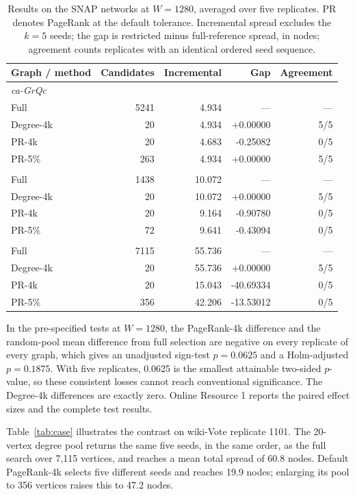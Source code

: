 \documentclass[smallextended]{svjour3}
\begin{document}
\begin{table}[htbp]
\caption{Results on the SNAP networks at $W=1280$, averaged over five replicates. PR denotes PageRank at the default tolerance. Incremental spread excludes the $k=5$ seeds; the gap is restricted minus full-reference spread, in nodes; agreement counts replicates with an identical ordered seed sequence.}\label{tab:primary}
\centering\begin{tabular}{lrrrr}\toprule
Graph / method & Candidates & Incremental & Gap & Agreement \\ \midrule
\multicolumn{5}{l}{\textit{ca-GrQc}} \\
Full & 5241 & 4.934 & --- & --- \\
Degree-4k & 20 & 4.934 & +0.00000 & 5/5 \\
PR-4k & 20 & 4.683 & -0.25082 & 0/5 \\
PR-5\% & 263 & 4.934 & +0.00000 & 5/5 \\
\addlinespace
\multicolumn{5}{l}{\textit{CollegeMsg}} \\
Full & 1438 & 10.072 & --- & --- \\
Degree-4k & 20 & 10.072 & +0.00000 & 5/5 \\
PR-4k & 20 & 9.164 & -0.90780 & 0/5 \\
PR-5\% & 72 & 9.641 & -0.43094 & 0/5 \\
\addlinespace
\multicolumn{5}{l}{\textit{wiki-Vote}} \\
Full & 7115 & 55.736 & --- & --- \\
Degree-4k & 20 & 55.736 & +0.00000 & 5/5 \\
PR-4k & 20 & 15.043 & -40.69334 & 0/5 \\
PR-5\% & 356 & 42.206 & -13.53012 & 0/5 \\
\bottomrule\end{tabular}
\end{table}

In the pre-specified tests at $W=1280$, the PageRank-4k difference and the random-pool mean difference from full selection are negative on every replicate of every graph, which gives an unadjusted sign-test $p=0.0625$ and a Holm-adjusted $p=0.1875$. With five replicates, 0.0625 is the smallest attainable two-sided $p$-value, so these consistent losses cannot reach conventional significance. The Degree-4k differences are exactly zero. Online Resource 1 reports the paired effect sizes and the complete test results.

Table~\ref{tab:case} illustrates the contrast on wiki-Vote replicate 1101. The 20-vertex degree pool returns the same five seeds, in the same order, as the full search over 7,115 vertices, and reaches a mean total spread of 60.8 nodes. Default PageRank-4k selects five different seeds and reaches 19.9 nodes; enlarging its pool to 356 vertices raises this to 47.2 nodes.
\end{document}
